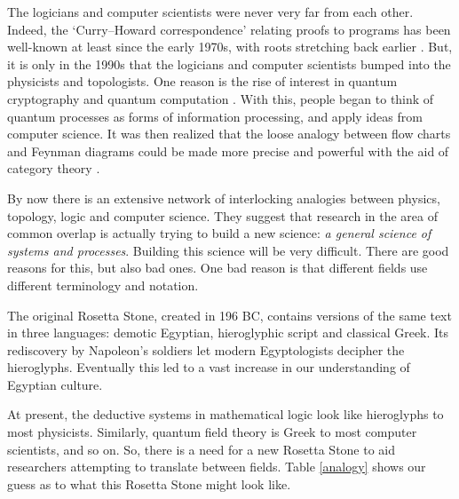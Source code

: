 \documentclass[12pt,twoside,openright]{report}
\begin{document}
The logicians and computer scientists were never very far from each other.  Indeed, the `Curry--Howard correspondence' relating proofs to programs has been well-known at least since the early 1970s, with roots stretching back earlier \cite{Curry,Howard}.  But, it is only in the 1990s that the logicians and computer scientists bumped into the physicists and topologists.  One reason is the rise of interest in quantum cryptography and quantum computation \cite{ChuangNielsen}. With this, people began to think of quantum processes as forms of information processing, and apply ideas from computer science. It was then realized that the loose analogy between flow charts and Feynman diagrams could be made more precise and powerful with the aid of category theory \cite{AC}.

By now there is an extensive network of interlocking analogies between physics, topology, logic and computer science.   They suggest that research in the area of common overlap is actually trying to build a new science: {\it a general science of systems and processes}. Building this science will be very difficult. There are good reasons for this, but also bad ones.  One bad reason is that different fields use different terminology and notation.

The original Rosetta Stone, created in 196 BC, contains versions of the same text in three languages: demotic Egyptian, hieroglyphic script and classical Greek.  Its rediscovery by Napoleon's soldiers let modern Egyptologists decipher the hieroglyphs.  Eventually this led to a vast increase in our understanding of Egyptian culture.

At present, the deductive systems in mathematical logic look like hieroglyphs to most physicists.  Similarly, quantum field theory is Greek to most computer scientists, and so on.  So, there is a need for a new Rosetta Stone to aid researchers attempting to translate between fields. Table \ref{analogy} shows our guess as to what this Rosetta Stone might look like.  
\end{document}
